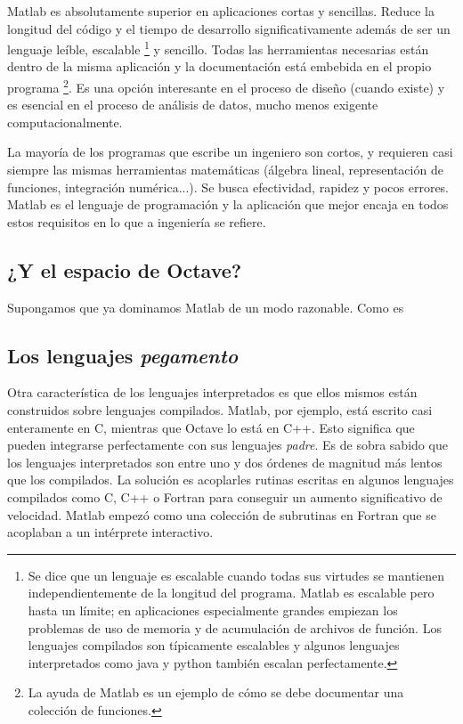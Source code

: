 Matlab es absolutamente superior en aplicaciones cortas y sencillas.
Reduce la longitud del código y el tiempo de desarrollo
significativamente además de ser un lenguaje leíble, escalable%
\footnote{Se dice que un lenguaje es escalable cuando todas sus
  virtudes se mantienen independientemente de la longitud del
  programa. Matlab es escalable pero hasta un límite; en aplicaciones
  especialmente grandes empiezan los problemas de uso de memoria y de
  acumulación de archivos de función. Los lenguajes compilados son
  típicamente escalables y algunos lenguajes interpretados como java y
  python también escalan perfectamente.%
} y sencillo. Todas las herramientas necesarias están dentro de la
misma aplicación y la documentación está embebida en el propio
programa%
\footnote{La ayuda de Matlab es un ejemplo de cómo se debe documentar
  una colección de funciones.%
}. Es una opción interesante en el proceso de diseño (cuando existe) y
es esencial en el proceso de análisis de datos, mucho menos exigente
computacionalmente.

La mayoría de los programas que escribe un ingeniero son cortos, y
requieren casi siempre las mismas herramientas matemáticas (álgebra
lineal, representación de funciones, integración numérica...). Se
busca efectividad, rapidez y pocos errores. Matlab es el lenguaje de
programación y la aplicación que mejor encaja en todos estos
requisitos en lo que a ingeniería se refiere.


\subsection{¿Y el espacio de Octave?}

Supongamos que ya dominamos Matlab de un modo razonable.  Como es 

\subsection{Los lenguajes \emph{pegamento}}

Otra característica de los lenguajes interpretados es que ellos mismos
están construidos sobre lenguajes compilados. Matlab, por ejemplo,
está escrito casi enteramente en C, mientras que Octave lo está en
C++. Esto significa que pueden integrarse perfectamente con sus
lenguajes \emph{padre}. Es de sobra sabido que los lenguajes
interpretados son entre uno y dos órdenes de magnitud más lentos que
los compilados.  La solución es acoplarles rutinas escritas en algunos
lenguajes compilados como C, C++ o Fortran para conseguir un aumento
significativo de velocidad.  Matlab empezó como una colección de
subrutinas en Fortran que se acoplaban a un intérprete interactivo.


